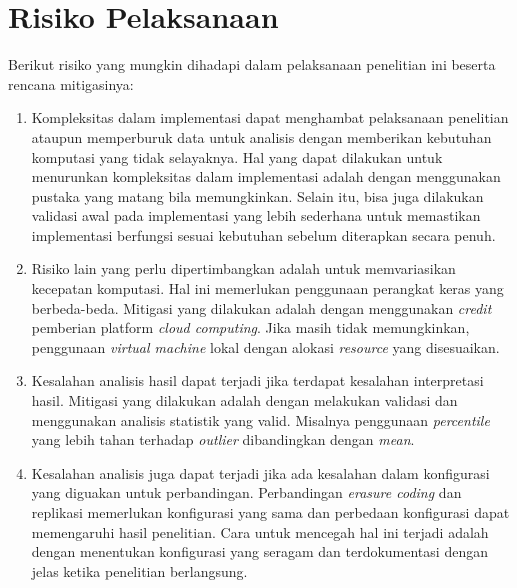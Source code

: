\section{Risiko Pelaksanaan}
\label{sec:risiko-pelaksanaan}
Berikut risiko yang mungkin dihadapi dalam pelaksanaan penelitian ini beserta rencana mitigasinya:

\begin{enumerate}
    \item Kompleksitas dalam implementasi dapat menghambat pelaksanaan penelitian ataupun memperburuk data untuk analisis dengan memberikan kebutuhan komputasi yang tidak selayaknya. Hal yang dapat dilakukan untuk menurunkan kompleksitas dalam implementasi adalah dengan menggunakan pustaka yang matang bila memungkinkan. Selain itu, bisa juga dilakukan validasi awal pada implementasi yang lebih sederhana untuk memastikan implementasi berfungsi sesuai kebutuhan sebelum diterapkan secara penuh.
    \item Risiko lain yang perlu dipertimbangkan adalah untuk memvariasikan kecepatan komputasi. Hal ini memerlukan penggunaan perangkat keras yang berbeda-beda. Mitigasi yang dilakukan adalah dengan menggunakan \textit{credit} pemberian platform \textit{cloud computing}. Jika masih tidak memungkinkan, penggunaan \textit{virtual machine} lokal dengan alokasi \textit{resource} yang disesuaikan.
    \item Kesalahan analisis hasil dapat terjadi jika terdapat kesalahan interpretasi hasil. Mitigasi yang dilakukan adalah dengan melakukan validasi dan menggunakan analisis statistik yang valid. Misalnya penggunaan \textit{percentile} yang lebih tahan terhadap \textit{outlier} dibandingkan dengan \textit{mean}.
    \item Kesalahan analisis juga dapat terjadi jika ada kesalahan dalam konfigurasi yang diguakan untuk perbandingan. Perbandingan \textit{erasure coding} dan replikasi memerlukan konfigurasi yang sama dan perbedaan konfigurasi dapat memengaruhi hasil penelitian. Cara untuk mencegah hal ini terjadi adalah dengan menentukan konfigurasi yang seragam dan terdokumentasi dengan jelas ketika penelitian berlangsung.
\end{enumerate}